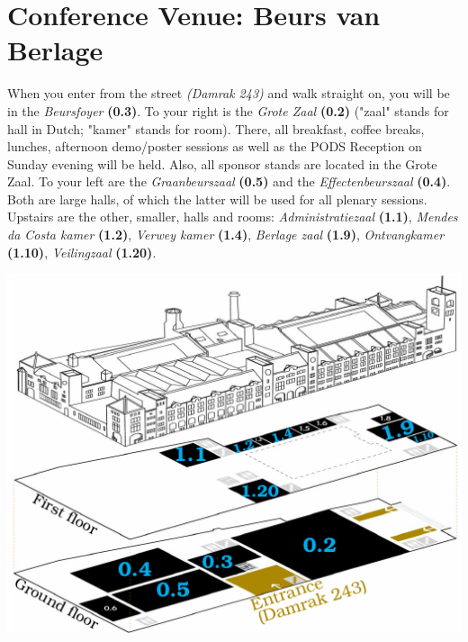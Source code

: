 
\section{Conference Venue: Beurs van Berlage}

When you enter from the street \emph{(Damrak 243)} and walk straight on, you will be in the \emph{Beursfoyer} \textbf{(0.3)}. To your right is the \emph{Grote Zaal} \textbf{(0.2)} ("zaal" stands for hall in Dutch; "kamer" stands for room). There, all breakfast, coffee breaks, lunches, afternoon demo/poster sessions as well as the PODS Reception on Sunday evening will be held. Also, all sponsor stands are located in the Grote Zaal. To your left are the \emph{Graanbeurszaal} \textbf{(0.5)} and the \emph{Effectenbeurszaal} \textbf{(0.4)}. Both are large halls, of which the latter will be used for all plenary sessions. Upstairs are the other, smaller, halls and rooms: \emph{Administratiezaal} \textbf{(1.1)}, \emph{Mendes da Costa kamer} \textbf{(1.2)}, \emph{Verwey kamer} \textbf{(1.4)}, \emph{Berlage zaal} \textbf{(1.9)}, \emph{Ontvangkamer} \textbf{(1.10)}, \emph{Veilingzaal} \textbf{(1.20)}.

\includegraphics[width=\textwidth]{images/BvB-plan-3D-85mm-x-1__mm.pdf}%



